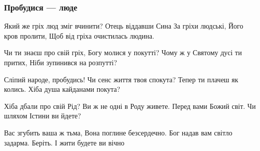  
 
 

\subsubsection{Пробудися --- люде}
\label{sec:poetry.rus.sokor.probudysja_lude}

Який же гріх люд зміг вчинити?
Отець віддавши Сина
За гріхи людські, Його кров пролити,
Щоб від гріха очистилась людина.

Чи ти знаєш про свій гріх,
Богу молися у покутті?
Чому ж у Святому дусі ти притих,
Ніби зупинився на розпутті?

Сліпий народе, пробудись!
Чи сенс життя твоя спокута?
Тепер ти плачеш як колись.
Хіба душа кайданами покута?

Хіба дбали про свій Рід?
Ви ж не одні в Роду живете.
Перед вами Божий світ.
Чи шляхом Істини ви йдете?

Вас згубить ваша ж тьма,
Вона поглине безсердечно.
Бог надав вам світло задарма.
Беріть. І жити будете ви вічно
